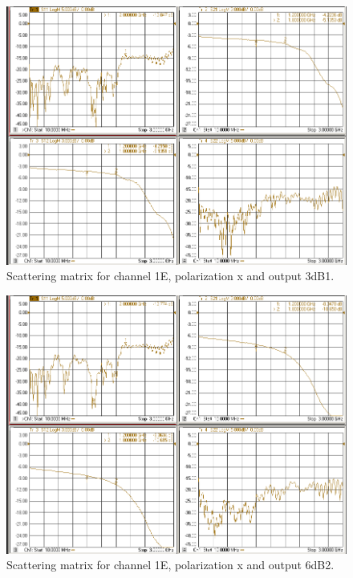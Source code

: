 \documentclass[12pt,a4paper,oneside]{article}
\begin{document}
\begin{figure}[H]
\centering
\includegraphics[width=0.9\linewidth]{VNA_results/1Ex_3dB1.png}
\caption{Scattering matrix for channel 1E, polarization x and output 3dB1.}
\label{fig:1Ex_3dB1}
\end{figure}


\begin{figure}[H]
\centering
\includegraphics[width=0.9\linewidth]{VNA_results/1Ex_6dB2.png}
\caption{Scattering matrix for channel 1E, polarization x and output 6dB2.}
\label{fig:1Ex_6dB2}
\end{figure}
\end{document}
